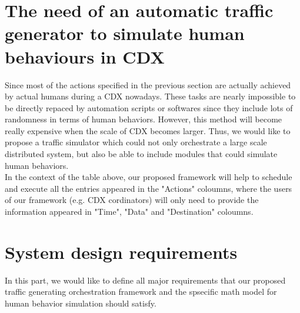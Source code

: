 \documentclass[12pt]{report}
\begin{document}
\section{The need of an automatic traffic generator to simulate human behaviours in CDX}
Since most of the actions specified in the previous section are actually achieved by actual humans during a CDX nowadays. These tasks are nearly impossible to be directly repaced by automation scripts or softwares since they include lots of randomness in terms of human behaviors. However, this method will become really expensive when the scale of CDX becomes larger. Thus, we would like to propose a traffic simulator which could not only orchestrate a large scale distributed system, but also be able to include modules that could simulate human behaviors.\\

In the context of the table above, our proposed framework will help to schedule and execute all the entries appeared in the "Actions" coloumns, where the users of our framework (e.g. CDX cordinators) will only need to provide the information appeared in "Time", "Data" and "Destination" coloumns.

\section{System design requirements}

In this part, we would like to define all major requirements that our proposed traffic generating orchestration framework and the spsecific math model for human behavior simulation should satisfy.
\end{document}
